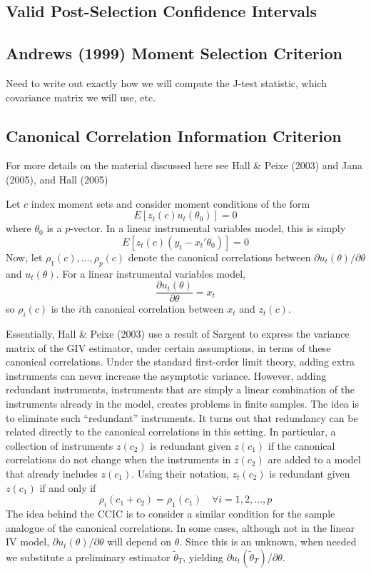 \documentclass[12pt]{article}
\theoremstyle{definition}
\begin{document}
\subsection{Valid Post-Selection Confidence Intervals}

\subsection{Andrews (1999) Moment Selection Criterion}
Need to write out exactly how we will compute the J-test statistic, which covariance matrix we will use, etc.

\subsection{Canonical Correlation Information Criterion}
For more details on the material discussed here see Hall \& Peixe (2003) and Jana (2005), and Hall (2005)

Let $c$ index moment sets and consider moment conditions of the form 
  $$E[z_t(c)u_t(\theta_0)]=0$$
where $\theta_0$ is a $p$-vector. In a linear instrumental variables model, this is simply
  $$E[z_t(c) (y_t - x_t'\theta_0)] = 0$$
Now, let $\rho_1(c), \hdots, \rho_p(c)$ denote the canonical correlations between $\partial u_t(\theta)/\partial \theta$ and $u_t(\theta)$. For a linear instrumental variables model, 
  $$\frac{\partial u_t(\theta)}{\partial \theta} = x_t$$
so $\rho_i(c)$ is the $i$th canonical correlation between $x_t$ and $z_t(c)$. 

Essentially, Hall \& Peixe (2003) use a result of Sargent to express the variance matrix of the GIV estimator, under certain assumptions, in terms of these canonical correlations. Under the standard first-order limit theory, adding extra instruments can never increase the asymptotic variance. However, adding redundant instruments, instruments that are simply a linear combination of the instruments already in the model, creates problems in finite samples. The idea is to eliminate such ``redundant'' instruments. It turns out that redundancy can be related directly to the canonical correlations in this setting. In particular, a collection of instruments $z(c_2)$ is redundant given $z(c_1)$ if the canonical correlations do not change when the instruments in $z(c_2)$ are added to a model that already includes $z(c_1)$. Using their notation, $z_t(c_2)$ is redundant given $z(c_1)$ if and only if
  $$\rho_i(c_1 + c_2) = \rho_1(c_1) \quad \forall i = 1,2, \hdots, p$$
The idea behind the CCIC is to consider a similar condition for the sample analogue of the canonical correlations. In some cases, although not in the linear IV model, $\partial u_t(\theta)/\partial \theta$ will depend on $\theta$. Since this is an unknown, when needed we substitute a preliminary estimator $\widetilde{\theta}_T$, yielding $\partial u_t(\widetilde{\theta}_T)/\partial \theta$.
\end{document}
